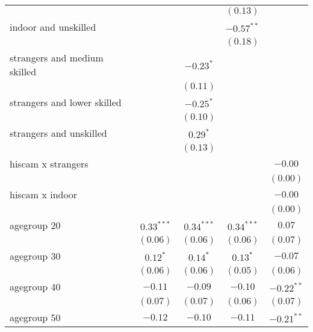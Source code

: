 \begin{table}
\begin{center}
\begin{tabular}{l c c c c}
                             &               &               & $(0.13)$      &               \\
indoor and unskilled         &               &               & $-0.57^{**}$  &               \\
                             &               &               & $(0.18)$      &               \\
strangers and medium skilled &               & $-0.23^{*}$   &               &               \\
                             &               & $(0.11)$      &               &               \\
strangers and lower skilled  &               & $-0.25^{*}$   &               &               \\
                             &               & $(0.10)$      &               &               \\
strangers and unskilled      &               & $0.29^{*}$    &               &               \\
                             &               & $(0.13)$      &               &               \\
hiscam x strangers           &               &               &               & $-0.00$       \\
                             &               &               &               & $(0.00)$      \\
hiscam x indoor              &               &               &               & $-0.00$       \\
                             &               &               &               & $(0.00)$      \\
agegroup 20                  & $0.33^{***}$  & $0.34^{***}$  & $0.34^{***}$  & $0.07$        \\
                             & $(0.06)$      & $(0.06)$      & $(0.06)$      & $(0.07)$      \\
agegroup 30                  & $0.12^{*}$    & $0.14^{*}$    & $0.13^{*}$    & $-0.07$       \\
                             & $(0.06)$      & $(0.06)$      & $(0.05)$      & $(0.06)$      \\
agegroup 40                  & $-0.11$       & $-0.09$       & $-0.10$       & $-0.22^{**}$  \\
                             & $(0.07)$      & $(0.07)$      & $(0.06)$      & $(0.07)$      \\
agegroup 50                  & $-0.12$       & $-0.10$       & $-0.11$       & $-0.21^{**}$  \\

\end{tabular}
\end{center}
\end{table}

